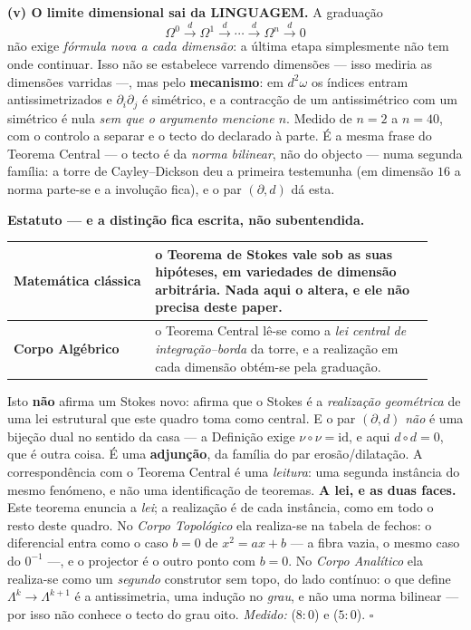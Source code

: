 \documentclass[livro.tex]{subfiles}
\begin{document}
\begin{teorema}
\textbf{(v) O limite dimensional sai da LINGUAGEM.} A graduação
\[
\Omega^{0}\xrightarrow{\;d\;}\Omega^{1}\xrightarrow{\;d\;}\cdots
\xrightarrow{\;d\;}\Omega^{n}\xrightarrow{\;d\;}0
\]
não exige \emph{fórmula nova a cada dimensão}: a última etapa
simplesmente não tem onde continuar. Isso não se estabelece varrendo
dimensões --- isso mediria as dimensões varridas ---, mas pelo
\textbf{mecanismo}: em $d^{2}\omega$ os índices entram
antissimetrizados e $\partial_i\partial_j$ é simétrico, e a contracção
de um antissimétrico com um simétrico é nula \emph{sem que o argumento
mencione $n$}. Medido de $n=2$ a $n=40$, com o controlo a separar e o
tecto do  declarado à parte. É a mesma frase do Teorema
Central --- o tecto é da \emph{norma bilinear}, não do objecto --- numa
segunda família: a torre de Cayley--Dickson deu a primeira testemunha
(em dimensão $16$ a norma parte-se e a involução fica), e o par
$(\partial,d)$ dá esta.

\textbf{Estatuto --- e a distinção fica escrita, não subentendida.}
\begin{center}\small
\begin{tabular}{@{}p{0.31\linewidth}p{0.61\linewidth}@{}}
\toprule
\textbf{Matemática clássica} & o Teorema de Stokes vale sob as suas
hipóteses, em variedades de dimensão arbitrária. Nada aqui o altera,
e ele não precisa deste paper. \\
\midrule
\textbf{Corpo Algébrico} & o Teorema Central lê-se como a \emph{lei
central de integração--borda} da torre, e a realização em cada
dimensão obtém-se pela graduação. \\
\bottomrule
\end{tabular}
\end{center}
\noindent Isto \textbf{não} afirma um Stokes novo: afirma que o Stokes
é a \emph{realização geométrica} de uma lei estrutural que este quadro
toma como central. E o par $(\partial,d)$ \emph{não} é uma bijeção dual
no sentido da casa --- a Definição exige $\nu\circ\nu=\mathrm{id}$, e
aqui $d\circ d=0$, que é outra coisa. É uma \textbf{adjunção}, da
família do par erosão/dilatação. A correspondência com o Teorema
Central é uma \emph{leitura}: uma segunda instância do mesmo fenómeno,
e não uma identificação de teoremas.
\textbf{A lei, e as duas faces.} Este teorema enuncia a \emph{lei}; a
realização é de cada instância, como em todo o resto deste quadro. No
\emph{Corpo Topológico} ela realiza-se na tabela de fechos: o diferencial
entra como o caso $b=0$ de $x^{2}=ax+b$ --- a fibra vazia, o mesmo caso
do $0^{-1}$ ---, e o projector é o outro ponto com $b=0$. No
\emph{Corpo Analítico} ela realiza-se como um \emph{segundo} construtor
sem topo, do lado contínuo: o que define $\Lambda^{k}\to\Lambda^{k+1}$
é a antissimetria, uma indução no \emph{grau}, e não uma norma
bilinear --- por isso não conhece o tecto do grau oito.
\emph{Medido:}  ($8{:}0$) e
 ($5{:}0$).
$\square$
\end{teorema}
\end{document}
